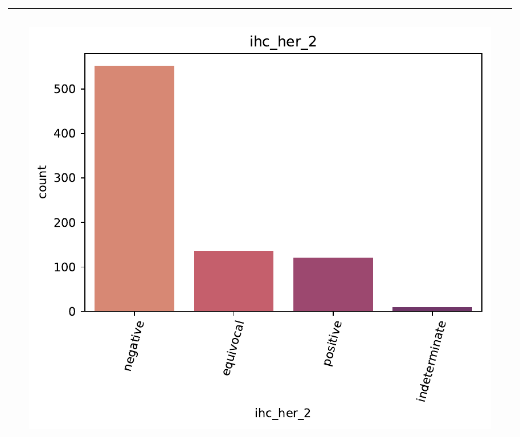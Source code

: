 \begin{table}[!htb]
\begin{threeparttable}
\begin{tabular}{p{2.5cm} p{7cm} p{6.5cm}}
			& \begin{center}\includegraphics[width=1\linewidth]{NOTEBOOK/IMAGENES_DESCRIPTIVAS/20_ihc_her_2}\end{center}
			\\ \hline
			
		\end{tabular}
	\end{threeparttable}
\end{table}

